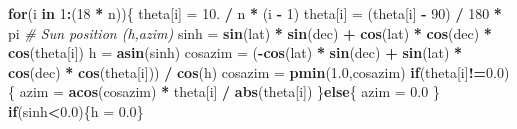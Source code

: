 \documentclass[]{book}
\newenvironment{Shaded}{\begin{snugshade}}{\end{snugshade}}
\newcommand{\KeywordTok}[1]{\textcolor[rgb]{0.13,0.29,0.53}{\textbf{#1}}}
\newcommand{\DecValTok}[1]{\textcolor[rgb]{0.00,0.00,0.81}{#1}}
\newcommand{\FloatTok}[1]{\textcolor[rgb]{0.00,0.00,0.81}{#1}}
\newcommand{\StringTok}[1]{\textcolor[rgb]{0.31,0.60,0.02}{#1}}
\newcommand{\CommentTok}[1]{\textcolor[rgb]{0.56,0.35,0.01}{\textit{#1}}}
\newcommand{\ControlFlowTok}[1]{\textcolor[rgb]{0.13,0.29,0.53}{\textbf{#1}}}
\newcommand{\OperatorTok}[1]{\textcolor[rgb]{0.81,0.36,0.00}{\textbf{#1}}}
\newcommand{\NormalTok}[1]{#1}
\theoremstyle{definition}
\theoremstyle{definition}
\theoremstyle{definition}
\theoremstyle{remark}
\begin{document}
\begin{Shaded}
\begin{Highlighting}[]
  \ControlFlowTok{for}\NormalTok{(i }\ControlFlowTok{in} \DecValTok{1}\OperatorTok{:}\NormalTok{(}\DecValTok{18} \OperatorTok{*}\StringTok{ }\NormalTok{n))\{}
\NormalTok{    theta[i] =}\StringTok{ }\DecValTok{10}\NormalTok{. }\OperatorTok{/}\StringTok{ }\NormalTok{n }\OperatorTok{*}\StringTok{ }\NormalTok{(i }\OperatorTok{-}\StringTok{ }\DecValTok{1}\NormalTok{)}
\NormalTok{    theta[i] =}\StringTok{ }\NormalTok{(theta[i] }\OperatorTok{-}\StringTok{ }\DecValTok{90}\NormalTok{) }\OperatorTok{/}\StringTok{ }\DecValTok{180} \OperatorTok{*}\StringTok{ }\NormalTok{pi}
    \CommentTok{# Sun position (h,azim)}
\NormalTok{    sinh =}\StringTok{ }\KeywordTok{sin}\NormalTok{(lat) }\OperatorTok{*}\StringTok{ }\KeywordTok{sin}\NormalTok{(dec) }\OperatorTok{+}\StringTok{ }\KeywordTok{cos}\NormalTok{(lat) }\OperatorTok{*}\StringTok{ }\KeywordTok{cos}\NormalTok{(dec) }\OperatorTok{*}\StringTok{ }\KeywordTok{cos}\NormalTok{(theta[i])}
\NormalTok{    h =}\StringTok{ }\KeywordTok{asin}\NormalTok{(sinh)}
\NormalTok{    cosazim =}\StringTok{ }\NormalTok{(}\OperatorTok{-}\KeywordTok{cos}\NormalTok{(lat) }\OperatorTok{*}\StringTok{ }\KeywordTok{sin}\NormalTok{(dec) }\OperatorTok{+}\StringTok{ }\KeywordTok{sin}\NormalTok{(lat) }\OperatorTok{*}\StringTok{ }\KeywordTok{cos}\NormalTok{(dec) }\OperatorTok{*}\StringTok{ }\KeywordTok{cos}\NormalTok{(theta[i])) }\OperatorTok{/}\StringTok{ }\KeywordTok{cos}\NormalTok{(h)}
\NormalTok{    cosazim =}\StringTok{ }\KeywordTok{pmin}\NormalTok{(}\FloatTok{1.0}\NormalTok{,cosazim)}
    \ControlFlowTok{if}\NormalTok{(theta[i]}\OperatorTok{!=}\FloatTok{0.0}\NormalTok{)\{}
\NormalTok{      azim =}\StringTok{ }\KeywordTok{acos}\NormalTok{(cosazim) }\OperatorTok{*}\StringTok{ }\NormalTok{theta[i] }\OperatorTok{/}\StringTok{ }\KeywordTok{abs}\NormalTok{(theta[i])}
\NormalTok{    \}}\ControlFlowTok{else}\NormalTok{\{}
\NormalTok{      azim =}\StringTok{ }\FloatTok{0.0}
\NormalTok{    \}}
    \ControlFlowTok{if}\NormalTok{(sinh}\OperatorTok{<}\FloatTok{0.0}\NormalTok{)\{h =}\StringTok{ }\FloatTok{0.0}\NormalTok{\}}
    

\end{Highlighting}
\end{Shaded}
\end{document}
